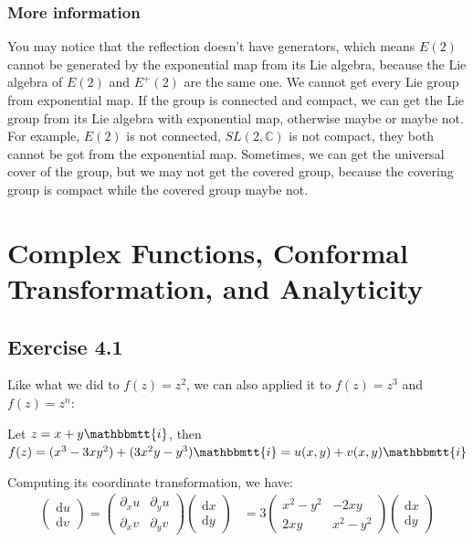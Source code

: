 \documentclass[]{ctexart}
\newcommand{\mi}{\mathbbmtt{i}}
\newcommand{\di}{\mathrm{d}}
\newcommand{\pa}{\partial}
\begin{document}
			\subsubsection{More information}
				You may notice that the reflection doesn't have generators, which means $E(2)$ cannot be generated by the exponential map from its Lie algebra, because the Lie algebra of $E(2)$ and $E^+(2)$ are the same one. We cannot get every Lie group from exponential map. If the group is connected and compact, we can get the Lie group from its Lie algebra with exponential map, otherwise maybe or maybe not. For example, $ E(2) $ is not connected, $ SL(2,\mathbb{C}) $ is not compact, they both cannot be got from the exponential map. Sometimes, we can get the universal cover of the group, but we may not get the covered group, because the covering group is compact while the covered group maybe not. 
	
\section{Complex Functions, Conformal Transformation, and Analyticity}
	\subsection{Exercise 4.1}
		Like what we did to $f(z)=z^2$, we can also applied it to $f(z)=z^3$ and $f(z)=z^n$:
		
		Let $z=x+y\mi $, then $f(z)=(x^3-3xy^2)+(3x^2y-y^3)\mi =u(x,y)+v(x,y)\mi $
		
		Computing its coordinate transformation, we have:
			\begin{equation*}
			\begin{aligned}
				\begin{pmatrix}
					\di u\\
					\di v
				\end{pmatrix}
				=
				\begin{pmatrix}
					\pa_xu & \pa_yu\\
					\pa_xv & \pa_yv
				\end{pmatrix}
				\begin{pmatrix}
					\di x\\
					\di y
				\end{pmatrix}
				&=3
				\begin{pmatrix}
					x^2-y^2 & -2xy \\
					2xy & x^2-y^2 
				\end{pmatrix}
				\begin{pmatrix}
				\di x\\
				\di y
				\end{pmatrix}
			\end{aligned}
			\end{equation*}
		
\end{document}
